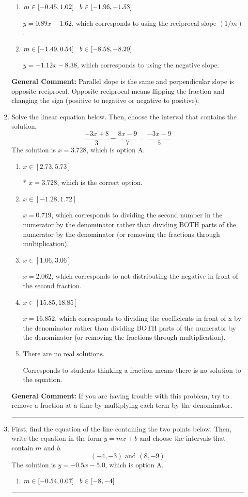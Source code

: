 \documentclass{extbook}[14pt]
\newcommand{\litem}[1]{\item #1

\rule{\textwidth}{0.4pt}}
\begin{document}
\begin{enumerate}
{\begin{enumerate}[label=\Alph*.]
 $y = 1.12x - 2.00$, which corresponds to correct slope and mis-distributing while simplifying to slope-intercept form.
\item \( m \in [-0.45, 1.02] \hspace*{3mm} b \in [-1.96, -1.53] \)

 $y = 0.89x - 1.62$, which corresponds to using the reciprocal slope $(1/m)$.
\item \( m \in [-1.49, 0.54] \hspace*{3mm} b \in [-8.58, -8.29] \)

 $y = -1.12x - 8.38$, which corresponds to using the negative slope.
\end{enumerate}

\textbf{General Comment:} Parallel slope is the same and perpendicular slope is opposite reciprocal. Opposite reciprocal means flipping the fraction and changing the sign (positive to negative or negative to positive).
}
\litem{
Solve the linear equation below. Then, choose the interval that contains the solution.
\[ \frac{-3x + 8}{3} - \frac{8x -9}{7} = \frac{-3x -9}{5} \]The solution is \( x = 3.728 \), which is option A.\begin{enumerate}[label=\Alph*.]
\item \( x \in [2.73, 5.73] \)

* $x = 3.728$, which is the correct option.
\item \( x \in [-1.28, 1.72] \)

 $x = 0.719$, which corresponds to dividing the second number in the numerator by the denominator rather than dividing BOTH parts of the numerator by the denominator (or removing the fractions through multiplication).
\item \( x \in [1.06, 3.06] \)

 $x = 2.062$, which corresponds to not distributing the negative in front of the second fraction.
\item \( x \in [15.85, 18.85] \)

 $x = 16.852$, which corresponds to dividing the coefficients in front of x by the denominator rather than dividing BOTH parts of the numerator by the denominator (or removing the fractions through multiplication).
\item \( \text{There are no real solutions.} \)

Corresponds to students thinking a fraction means there is no solution to the equation.
\end{enumerate}

\textbf{General Comment:} If you are having trouble with this problem, try to remove a fraction at a time by multiplying each term by the denominator.
}
\litem{
First, find the equation of the line containing the two points below. Then, write the equation in the form $ y=mx+b $ and choose the intervals that contain $m$ and $b$.
\[ (-4, -3) \text{ and } (8, -9) \]The solution is \( y = -0.5x -5.0 \), which is option A.\begin{enumerate}[label=\Alph*.]
\item \( m \in [-0.54, 0.07] \hspace*{3mm} b \in [-8, -4] \)


\end{enumerate}}
\end{enumerate}
\end{document}
